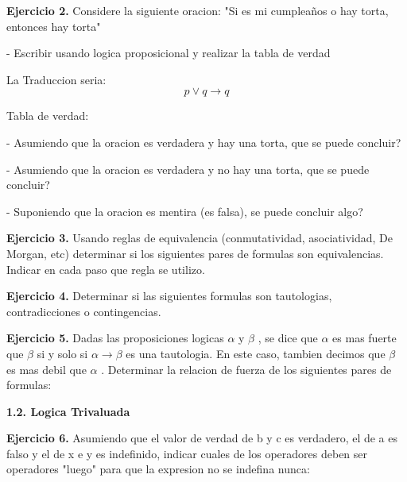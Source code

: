 \documentclass[12pt]{report}
\begin{document}
\vspace{0.8cm}
\textbf{Ejercicio 2.} Considere la siguiente oracion: "Si es mi cumpleaños o hay torta, entonces hay torta" 

\vspace{0.8cm}
- Escribir usando logica proposicional y realizar la tabla de verdad

La Traduccion seria:
$$ p \vee q \rightarrow q $$

Tabla de verdad:
$$ $$

\vspace{0.2cm}
- Asumiendo que la oracion es verdadera y hay una torta, que se puede concluir?

\vspace{0.2cm}
- Asumiendo que la oracion es verdadera y no hay una torta, que se puede concluir?

\vspace{0.2cm}
- Suponiendo que la oracion es mentira (es falsa), se puede concluir algo?


\vspace{0.8cm}
\textbf{Ejercicio 3.} Usando reglas de equivalencia (conmutatividad, asociatividad, De Morgan, etc) determinar si los siguientes
pares de formulas son equivalencias. Indicar en cada paso que regla se utilizo.
\vspace{0.8cm}


\vspace{0.8cm}
\textbf{Ejercicio 4.} Determinar si las siguientes formulas son tautologias, contradicciones o contingencias.
\vspace{0.8cm}


\vspace{0.8cm}
\textbf{Ejercicio 5.} Dadas las proposiciones logicas $\alpha$  y $\beta$ , se dice que $\alpha$ es mas fuerte que $\beta$ si y solo si $\alpha \rightarrow \beta$ es una tautologia.
En este caso, tambien decimos que $\beta$  es mas debil que $\alpha$ . Determinar la relacion de fuerza de los siguientes pares de formulas:
\vspace{0.8cm}



\textbf{1.2. Logica Trivaluada}

\vspace{0.8cm}
\textbf{Ejercicio 6.} Asumiendo que el valor de verdad de b y c es verdadero, el de a es falso y el de x e y es indefinido, indicar 
cuales de los operadores deben ser operadores "luego" para que la expresion no se indefina nunca:
\vspace{0.8cm}
\end{document}

